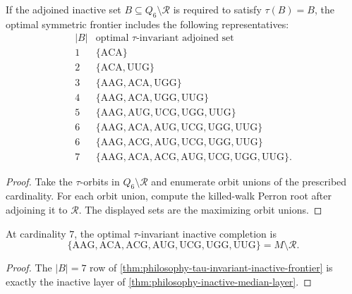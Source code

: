 \begin{theorem}
\label{thm:philosophy-tau-invariant-inactive-frontier}
If the adjoined inactive set $B\subseteq Q_{6}\setminus\mathcal{R}$ is
required to satisfy $\tau(B)=B$, the optimal symmetric frontier includes
the following representatives:
$$
\begin{array}{c|l}
  |B| & \text{optimal }\tau\text{-invariant adjoined set}\\
  \hline
  1 & \{\mathrm{ACA}\}\\
  2 & \{\mathrm{ACA},\mathrm{UUG}\}\\
  3 & \{\mathrm{AAG},\mathrm{ACA},\mathrm{UGG}\}\\
  4 & \{\mathrm{AAG},\mathrm{ACA},\mathrm{UGG},\mathrm{UUG}\}\\
  5 & \{\mathrm{AAG},\mathrm{AUG},\mathrm{UCG},\mathrm{UGG},\mathrm{UUG}\}\\
  6 & \{\mathrm{AAG},\mathrm{ACA},\mathrm{AUG},\mathrm{UCG},\mathrm{UGG},\mathrm{UUG}\}\\
  6 & \{\mathrm{AAG},\mathrm{ACG},\mathrm{AUG},\mathrm{UCG},\mathrm{UGG},\mathrm{UUG}\}\\
  7 & \{\mathrm{AAG},\mathrm{ACA},\mathrm{ACG},\mathrm{AUG},\mathrm{UCG},\mathrm{UGG},\mathrm{UUG}\}.
\end{array}
$$
\end{theorem}
\begin{proof}
Take the $\tau$-orbits in $Q_{6}\setminus\mathcal{R}$ and enumerate
orbit unions of the prescribed cardinality. For each orbit union,
compute the killed-walk Perron root after adjoining it to
$\mathcal{R}$. The displayed sets are the maximizing orbit unions.
\end{proof}

\begin{corollary}
\label{cor:philosophy-symmetric-completion-inactive-layer}
At cardinality $7$, the optimal $\tau$-invariant inactive completion is
$$
  \{\mathrm{AAG},\mathrm{ACA},\mathrm{ACG},
    \mathrm{AUG},\mathrm{UCG},\mathrm{UGG},\mathrm{UUG}\}
  =
  M\setminus\mathcal{R}.
$$
\end{corollary}
\begin{proof}
The $|B|=7$ row of
\autoref{thm:philosophy-tau-invariant-inactive-frontier} is exactly the
inactive layer of \autoref{thm:philosophy-inactive-median-layer}.
\end{proof}

